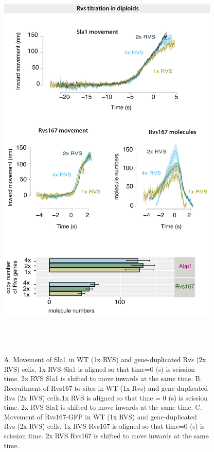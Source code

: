 			\begin{figure}[h]
			\centering
			\includegraphics[width=21cm,height=21cm,keepaspectratio]{figures/results_final/protein_friction2}
			\caption[Dynamics of endocytosis in diploid strains with gene duplicated Rvs]
			{A. Movement of Sla1 in WT (1x RVS) and gene-duplicated Rvs (2x RVS) cells. 1x RVS Sla1 is aligned so that time=0 (s) is scission time. 2x RVS Sla1 is shifted to move inwards at the same time.
			B. Recruitment of Rvs167 to sites in WT (1x Rvs)  and gene-duplicated Rvs (2x RVS) cells.1x RVS is aligned so that time = 0 (s) is scission time. 2x RVS Sla1 is shifted to move inwards at the same time.
			C.  Movement of Rvs167-GFP in WT (1x RVS) and gene-duplicated Rvs (2x RVS) cells. 1x RVS Rvs167 is aligned so that time=0 (s) is scission time. 2x RVS Rvs167 is shifted to move inwards at the same time.
			\label{fig_rvsdiploid}}
			\end{figure}
	
